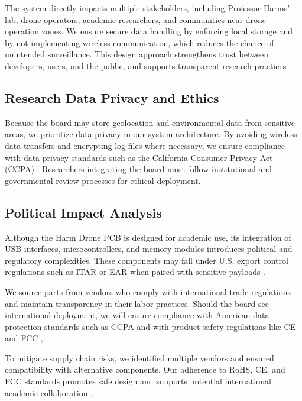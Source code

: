 \documentclass[12pt]{article}
\begin{document}
\par The system directly impacts multiple stakeholders, including Professor Harms' lab, drone operators, academic researchers, and communities near drone operation zones. We ensure secure data handling by enforcing local storage and by not implementing wireless communication, which reduces the chance of unintended surveillance. This design approach strengthens trust between developers, users, and the public, and supports transparent research practices \cite{ieee_ethics}.

\subsection{Research Data Privacy and Ethics}

\par Because the board may store geolocation and environmental data from sensitive areas, we prioritize data privacy in our system architecture. By avoiding wireless data transfers and encrypting log files where necessary, we ensure compliance with data privacy standards such as the California Consumer Privacy Act (CCPA) \cite{ccpa}. Researchers integrating the board must follow institutional and governmental review processes for ethical deployment.

\subsection{Political Impact Analysis}

\par Although the Harm Drone PCB is designed for academic use, its integration of USB interfaces, microcontrollers, and memory modules introduces political and regulatory complexities. These components may fall under U.S. export control regulations such as ITAR or EAR when paired with sensitive payloads \cite{ear}.

\par We source parts from vendors who comply with international trade regulations and maintain transparency in their labor practices. Should the board see international deployment, we will ensure compliance with American data protection standards such as CCPA and with product safety regulations like CE and FCC \cite{rohs}, \cite{ccpa}.

\par To mitigate supply chain risks, we identified multiple vendors and ensured compatibility with alternative components. Our adherence to RoHS, CE, and FCC standards promotes safe design and supports potential international academic collaboration \cite{rohs}.
\end{document}
